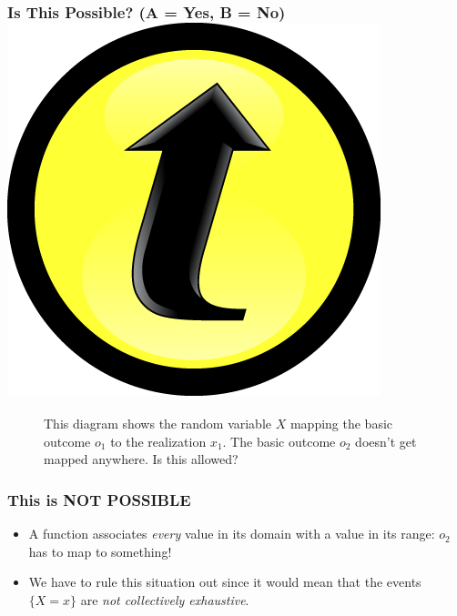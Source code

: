 \documentclass[handout]{beamer}
\begin{document}
\begin{frame}
\frametitle{Is This Possible? (A = Yes, B = No) \hfill \includegraphics[scale = 0.05]{./images/clicker}}

\begin{figure}
\centering
{}
\caption{This diagram shows the random variable $X$ mapping the basic outcome $o_1$ to the realization $x_1$. The basic outcome $o_2$ doesn't get mapped anywhere. Is this allowed?}
\end{figure}

\end{frame}
\begin{frame}
\frametitle{This is NOT POSSIBLE}



\begin{figure}
\end{figure}
\begin{itemize}
	\item A function associates \emph{every} value in its domain with a value in its range: $o_2$ has to map to something!
	\item We have to rule this situation out since it would mean that the events $\{X = x\}$ are \emph{not collectively exhaustive}. 
\end{itemize}


\end{frame}
\end{document}
